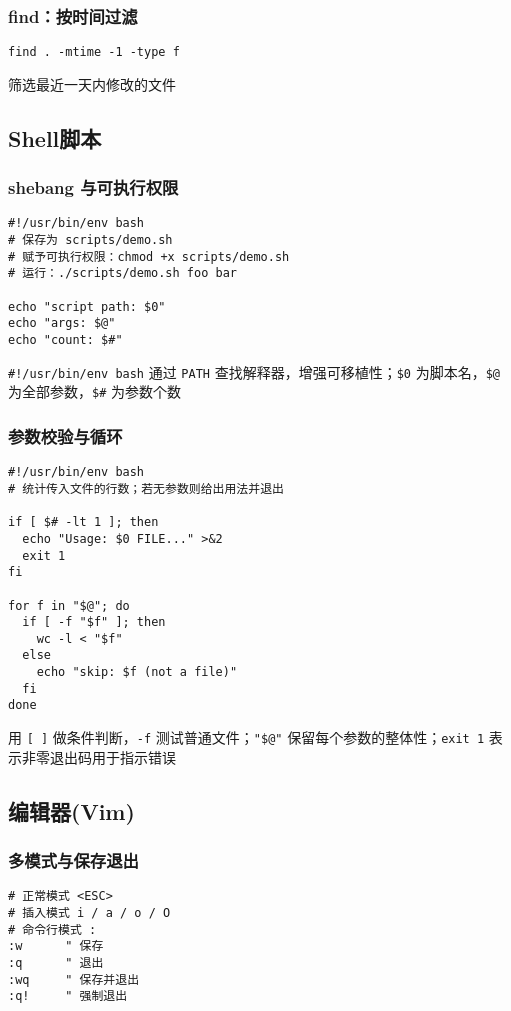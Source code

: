 \documentclass[a4paper,12pt]{ctexart}
\begin{document}
\subsubsection{find：按时间过滤}
\begin{lstlisting}
find . -mtime -1 -type f
\end{lstlisting}
筛选最近一天内修改的文件

\subsection{Shell脚本}

\subsubsection{shebang 与可执行权限}
\begin{lstlisting}
#!/usr/bin/env bash
# 保存为 scripts/demo.sh
# 赋予可执行权限：chmod +x scripts/demo.sh
# 运行：./scripts/demo.sh foo bar

echo "script path: $0"
echo "args: $@"
echo "count: $#"
\end{lstlisting}
\texttt{\#!/usr/bin/env bash} 通过 \texttt{PATH} 查找解释器，增强可移植性；\texttt{\$0} 为脚本名，\texttt{\$@} 为全部参数，\texttt{\$#} 为参数个数

\subsubsection{参数校验与循环}
\begin{lstlisting}
#!/usr/bin/env bash
# 统计传入文件的行数；若无参数则给出用法并退出

if [ $# -lt 1 ]; then
  echo "Usage: $0 FILE..." >&2
  exit 1
fi

for f in "$@"; do
  if [ -f "$f" ]; then
    wc -l < "$f"
  else
    echo "skip: $f (not a file)"
  fi
done
\end{lstlisting}
用 \texttt{[ ]} 做条件判断，\texttt{-f} 测试普通文件；\texttt{"\$@"} 保留每个参数的整体性；\texttt{exit 1} 表示非零退出码用于指示错误



\subsection{编辑器(Vim)}

\subsubsection{多模式与保存退出}
\begin{lstlisting}
# 正常模式 <ESC>
# 插入模式 i / a / o / O
# 命令行模式 :
:w      " 保存
:q      " 退出
:wq     " 保存并退出
:q!     " 强制退出
\end{lstlisting}
\end{document}
